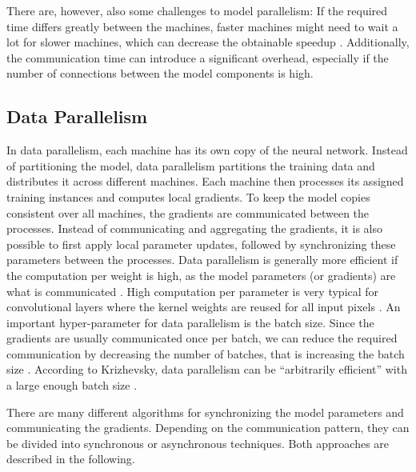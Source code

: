 \documentclass[conference,compsoc,a4paper]{IEEEtran}
\begin{document}
There are, however, also some challenges to model parallelism:
If the required time differs greatly between the machines, faster machines might need to wait a lot for slower machines, which can decrease the obtainable speedup \cite{dean2012-Large-scale-distributed}.
Additionally, the communication time can introduce a significant overhead, especially if the number of connections between the model components is high.


\subsection{Data Parallelism} %
\label{sub:data_parallelism}

In data parallelism, each machine has its own copy of the neural network.
Instead of partitioning the model, data parallelism partitions the training data and distributes it across different machines.
Each machine then processes its assigned training instances and computes local gradients.
To keep the model copies consistent over all machines, the gradients are communicated between the processes.
Instead of communicating and aggregating the gradients, it is also possible to first apply local parameter updates, followed by synchronizing these parameters between the processes.
%
Data parallelism is generally more efficient if the computation per weight is high, as the model parameters (or gradients) are what is communicated \cite{krizhevsky2014-One-weird-trick}.
High computation per parameter is very typical for convolutional layers where the kernel weights are reused for all input pixels \cite{krizhevsky2014-One-weird-trick}.
%
An important hyper-parameter for data parallelism is the batch size.
Since the gradients are usually communicated once per batch, we can reduce the required communication by decreasing the number of batches, that is increasing the batch size \cite{krizhevsky2014-One-weird-trick}.
According to Krizhevsky, data parallelism can be ``arbitrarily efficient'' with a large enough batch size \cite{krizhevsky2014-One-weird-trick}.

There are many different algorithms for synchronizing the model parameters and communicating the gradients.
Depending on the communication pattern, they can be divided into synchronous or asynchronous techniques.
Both approaches are described in the following.
\end{document}
